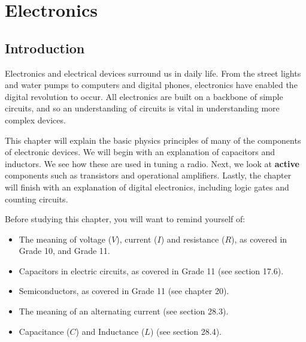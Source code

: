 \chapter{Electronics}
\label{p:em:el12}


\section{Introduction}
Electronics and electrical devices surround us in daily life. From the street lights and water pumps to computers and digital phones, electronics have enabled the digital revolution to occur. All electronics are built on a backbone of simple circuits, and so an understanding of circuits is vital in understanding more complex devices.

This chapter will explain the basic physics principles of many of the components of electronic devices.  We will begin with an explanation of capacitors and inductors. We see how these are used in tuning a radio.  Next, we look at {\bf active} components such as transistors and operational amplifiers. Lastly, the chapter will finish with an explanation of digital electronics, including logic gates and counting circuits. 

Before studying this chapter, you will want to remind yourself of:
\begin{itemize}
\item The meaning of voltage ($V$), current ($I$) and resistance ($R$), as covered in Grade 10, and Grade 11.
\item Capacitors in electric circuits, as covered in Grade 11 (see section 17.6).
\item Semiconductors, as covered in Grade 11 (see chapter 20).
\item The meaning of an alternating current (see section 28.3).
\item Capacitance ($C$) and Inductance ($L$) (see section 28.4).
\end{itemize}
